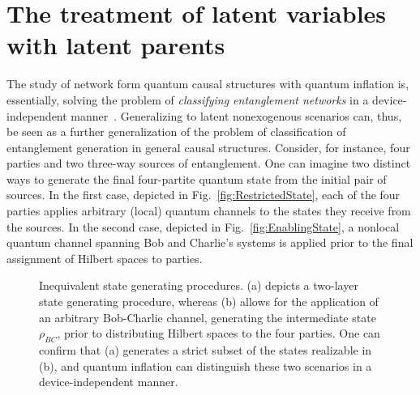 \documentclass[superscriptaddress,aps,prx,nofootinbib,twocolumn,twoside,reprint,letterpaper,longbibliography]{revtex4-2}
\begin{document}
\section{The treatment of latent variables with latent parents}\label{app:nonexog}
The study of network form quantum causal structures with quantum inflation is, essentially, solving the problem of \emph{classifying entanglement networks} in a device-independent manner~\cite{navascues2020gnme,Schmid2020LOSR}. Generalizing to latent nonexogenous scenarios can, thus, be seen as a further generalization of the problem of classification of entanglement generation in general causal structures. Consider, for instance, four parties and two three-way sources of entanglement. One can imagine two distinct ways to generate the final four-partite quantum state from the initial pair of sources. In the first case, depicted in Fig.~\ref{fig:RestrictedState}, each of the four parties applies arbitrary (local) quantum channels to the states they receive from the sources. In the second case, depicted in Fig.~\ref{fig:EnablingState}, a nonlocal quantum channel spanning Bob and Charlie's systems is applied prior to the final assignment of Hilbert spaces to parties.

\begin{figure}[b]
  \begin{center}
    \hfill
    \hfill
    \hfill
  \end{center}
  \caption[]{Inequivalent state generating procedures. (a) depicts a two-layer state generating procedure, whereas (b) allows for the application of an arbitrary Bob-Charlie channel, generating the intermediate state $\rho_{BC}$, prior to distributing Hilbert spaces to the four parties. One can confirm that (a) generates a strict subset of the states realizable in (b), and quantum inflation can distinguish these two scenarios in a device-independent manner.}
  \label{fig:ExogMoreSubtle}
\end{figure}
\end{document}
